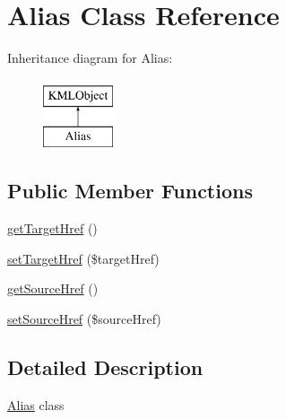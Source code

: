 \hypertarget{classAlias}{
\section{Alias Class Reference}
\label{d8/deb/classAlias}
}
Inheritance diagram for Alias:\begin{figure}[H]
\begin{center}
\leavevmode
\includegraphics[height=2.000000cm]{d8/deb/classAlias}
\end{center}
\end{figure}
\subsection*{Public Member Functions}
\begin{DoxyCompactItemize}
\item 
\hyperlink{classAlias_a4c5695b03188cb3ef107e10f193a196c}{getTargetHref} ()
\item 
\hyperlink{classAlias_a923aef34df7863364952c06864ea7a1c}{setTargetHref} (\$targetHref)
\item 
\hyperlink{classAlias_ac3376e6b3030d9897185c5044a879acd}{getSourceHref} ()
\item 
\hyperlink{classAlias_acf863ae57ff362426f283d05565ad43d}{setSourceHref} (\$sourceHref)
\end{DoxyCompactItemize}


\subsection{Detailed Description}
\hyperlink{classAlias}{Alias} class 

